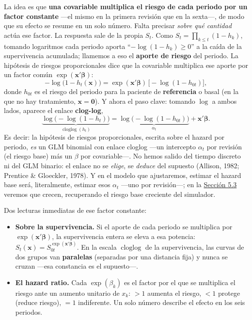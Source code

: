 \documentclass[
  letterpaper,
  DIV=11,
  numbers=noendperiod]{scrartcl}
\providecommand{\tightlist}{%
  \setlength{\itemsep}{0pt}\setlength{\parskip}{0pt}}\usepackage{longtable,booktabs,array}
\begin{document}
La idea es que \textbf{una covariable multiplica el riesgo de cada
periodo por un factor constante} ---el mismo en la primera revisión que
en la sexta---, de modo que su efecto se resume en un solo número. Falta
precisar \emph{sobre qué cantidad} actúa ese factor. La respuesta sale
de la propia \(S_t\). Como \(S_t=\prod_{k\le t}(1-h_k)\), tomando
logaritmos cada periodo aporta ``\(-\log(1-h_k)\ge 0\)'' a la caída de
la supervivencia acumulada; llamemos a eso el \textbf{aporte de riesgo}
del periodo. La hipótesis de riesgos proporcionales dice que la
covariable multiplica ese aporte por un factor común
\(\exp(\mathbf{x}'\boldsymbol\beta)\): \[
-\log\bigl(1-h_t(\mathbf{x})\bigr)=\exp(\mathbf{x}'\boldsymbol\beta)\,\bigl[-\log(1-h_{0t})\bigr],
\] donde \(h_{0t}\) es el riesgo del periodo para la paciente de
\textbf{referencia} o basal (en la que no hay tratamiento,
\(\mathbf{x}=\mathbf 0\)). Y ahora el paso clave: tomando \(\log\) a
ambos lados, aparece el enlace \textbf{clog-log}, \[
\underbrace{\log\bigl(-\log(1-h_t)\bigr)}_{\operatorname{cloglog}(h_t)}
=\underbrace{\log\bigl(-\log(1-h_{0t})\bigr)}_{\alpha_t}+\mathbf{x}'\boldsymbol\beta.
\] Es decir: la hipótesis de riesgos proporcionales, escrita sobre el
hazard por periodo, \emph{es} un GLM binomial con enlace cloglog ---un
intercepto \(\alpha_t\) por revisión (el riesgo base) más un \(\beta\)
por covariable---. No hemos salido del tiempo discreto ni del GLM
binario: el enlace no se \emph{elige}, se \emph{deduce} del supuesto
(Allison, 1982; Prentice \& Gloeckler, 1978). Y en el modelo que
ajustaremos, estimar el hazard base será, literalmente, estimar esos
\(\alpha_t\) ---uno por revisión---; en la
\protect\hyperlink{sec-u15-glm}{Sección 5.3} veremos que crecen,
recuperando el riesgo base creciente del simulador.

Dos lecturas inmediatas de ese factor constante:

\begin{itemize}
\tightlist
\item
  \textbf{Sobre la supervivencia.} Si el aporte de cada periodo se
  multiplica por \(\exp(\mathbf{x}'\boldsymbol\beta)\), la supervivencia
  entera se eleva a esa potencia:
  \(S_t(\mathbf{x})=S_{0t}^{\exp(\mathbf{x}'\boldsymbol\beta)}\). En la
  escala \(\operatorname{cloglog}\) de la supervivencia, las curvas de
  dos grupos van \textbf{paralelas} (separadas por una distancia fija) y
  nunca se cruzan ---esa constancia es el supuesto---.
\item
  \textbf{El hazard ratio.} Cada \(\exp(\beta_k)\) es el factor por el
  que se multiplica el riesgo ante un aumento unitario de \(x_k\):
  \(>1\) aumenta el riesgo, \(<1\) protege (reduce riesgo), \(=1\)
  indiferente. Un solo número describe el efecto en los seis periodos.
\end{itemize}
\end{document}
